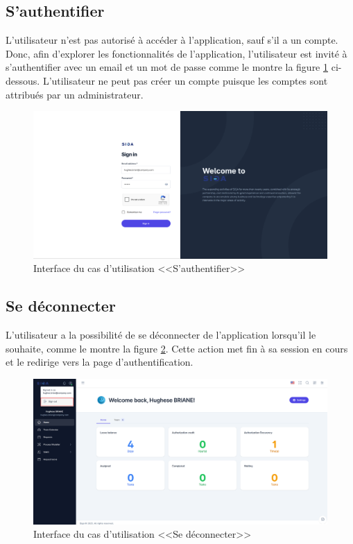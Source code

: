 \subsection{S’authentifier}
L’utilisateur n’est pas autorisé à accéder à l’application, sauf s’il a un compte. Donc, afin d’explorer les fonctionnalités de l’application, l’utilisateur est invité à s’authentifier avec un email et un mot de passe comme le montre la figure \ref{fig:realauth} ci-dessous. L’utilisateur ne peut pas créer un compte puisque les comptes sont attribués par un administrateur.
\begin{figure}[H]
     \centering
     \includegraphics[width=16cm]{images/realisation/login.png}
     \caption{Interface du cas d'utilisation <<S'authentifier>>}
     \label{fig:realauth}
\end{figure}
\subsection{Se déconnecter}
L’utilisateur a la possibilité de se déconnecter de l’application lorsqu’il le souhaite, comme le montre la figure \ref{fig:reallogout}. Cette action met fin à sa session en cours et le redirige vers la page d’authentification.
\newpage
\vspace*{-2cm}
\begin{figure}[H]
     \centering
     \includegraphics[width=16cm]{images/realisation/decon.png}
     \caption{Interface du cas d'utilisation <<Se déconnecter>>}
     \label{fig:reallogout}
\end{figure}
